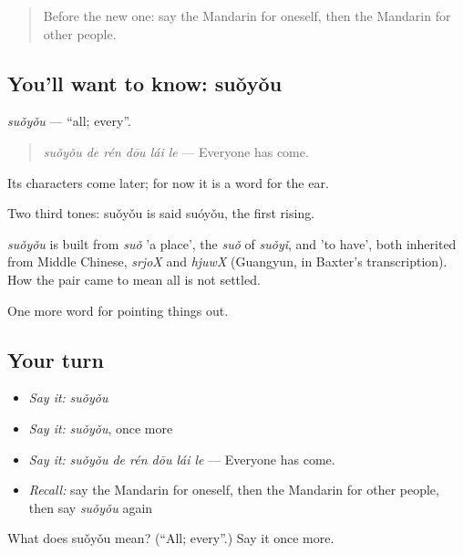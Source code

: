 \begin{quote}
Before the new one: say the Mandarin for oneself, then the Mandarin for other people.
\end{quote}

\subsection*{You'll want to know: suǒyǒu}
\emph{suǒyǒu} — \textquotedblleft{}all; every\textquotedblright{}.

\begin{quote}
\emph{suǒyǒu de rén dōu lái le} — Everyone has come.
\end{quote}

Its characters come later; for now it is a word for the ear.

Two third tones: suǒyǒu is said suóyǒu, the first rising.

\begin{cousinweb}
\emph{suǒyǒu} is built from \emph{suǒ} 'a place', the \emph{suǒ} of \emph{suǒyǐ}, and  'to have', both inherited from Middle Chinese, \emph{srjoX} and \emph{hjuwX} (Guangyun, in Baxter's transcription). How the pair came to mean all is not settled.
\end{cousinweb}

\begin{grammarlens}[title={What you've built}]
One more word for pointing things out.
\end{grammarlens}

\subsection*{Your turn}
\begin{itemize}
\raggedright
  \item \emph{Say it:} \emph{suǒyǒu}
  \item \emph{Say it:} \emph{suǒyǒu}, once more
  \item \emph{Say it:} \emph{suǒyǒu de rén dōu lái le} — Everyone has come.
  \item \emph{Recall:} say the Mandarin for oneself, then the Mandarin for other people, then say \emph{suǒyǒu} again
\end{itemize}

\begin{tcolorbox}[breakable,colback=teal!4,colframe=teal!35!black,title={Before you move on}]
What does suǒyǒu mean? (\textquotedblleft{}All; every\textquotedblright{}.) Say it once more.
\end{tcolorbox}
